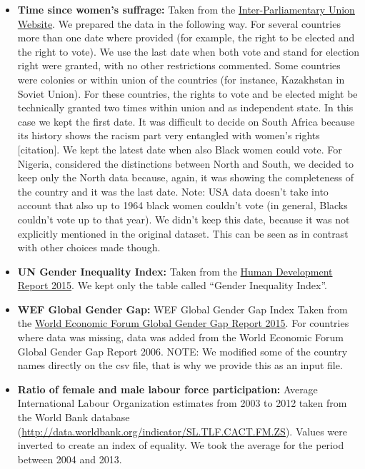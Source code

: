 \documentclass[
  11pt,
]{article}
\begin{document}
\begin{itemize}
\item
  \textbf{Time since women's suffrage:} Taken from the
  \href{http://www.ipu.org/wmn-e/suffrage.htm\#Note1}{Inter-Parliamentary
  Union Website}. We prepared the data in the following way. For several
  countries more than one date where provided (for example, the right to
  be elected and the right to vote). We use the last date when both vote
  and stand for election right were granted, with no other restrictions
  commented. Some countries were colonies or within union of the
  countries (for instance, Kazakhstan in Soviet Union). For these
  countries, the rights to vote and be elected might be technically
  granted two times within union and as independent state. In this case
  we kept the first date. It was difficult to decide on South Africa
  because its history shows the racism part very entangled with women's
  rights {[}citation{]}. We kept the latest date when also Black women
  could vote. For Nigeria, considered the distinctions between North and
  South, we decided to keep only the North data because, again, it was
  showing the completeness of the country and it was the last date.
  Note: USA data doesn't take into account that also up to 1964 black
  women couldn't vote (in general, Blacks couldn't vote up to that
  year). We didn't keep this date, because it was not explicitly
  mentioned in the original dataset. This can be seen as in contrast
  with other choices made though.
\item
  \textbf{UN Gender Inequality Index:} Taken from the
  \href{http://hdr.undp.org/sites/default/files/hdr_2016_statistical_annex.pdf}{Human
  Development Report 2015}. We kept only the table called ``Gender
  Inequality Index''.
\item
  \textbf{WEF Global Gender Gap:} WEF Global Gender Gap Index Taken from
  the \href{http://reports.weforum.org/}{World Economic Forum Global
  Gender Gap Report 2015}. For countries where data was missing, data
  was added from the World Economic Forum Global Gender Gap Report 2006.
  NOTE: We modified some of the country names directly on the csv file,
  that is why we provide this as an input file.
\item
  \textbf{Ratio of female and male labour force participation:} Average
  International Labour Organization estimates from 2003 to 2012 taken
  from the World Bank database
  (\url{http://data.worldbank.org/indicator/SL.TLF.CACT.FM.ZS}). Values
  were inverted to create an index of equality. We took the average for
  the period between 2004 and 2013.
\end{itemize}
\end{document}
